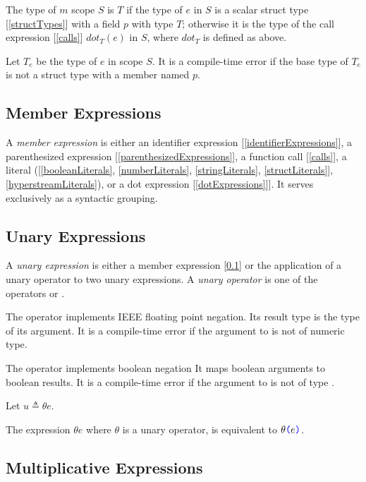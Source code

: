 \documentclass{article}
\begin{document}
The type of $m$ scope $S$
 is $T$ if the type of $e$ in $S$ is a scalar struct type [\ref{structTypes}] with a field $p$ with type $T$; otherwise it is the type of the call expression [\ref{calls}] $dot_T(e)$ in $S$, where $dot_T$ is defined as above.

Let $T_e$ be the type of $e$ in scope $S$.  It is a compile-time error if the base type of $T_e$ is not a struct type with a member named $p$. 

\subsection{Member Expressions}
\label{memberExpression}

A {\em member expression} is either an identifier expression [\ref{identifierExpressions}], a parenthesized expression [\ref{parenthesizedExpressions}], a function call [\ref{calls}], a literal ([\ref{booleanLiterals}, \ref{numberLiterals}, \ref{stringLiterals}, \ref{structLiterals}], \ref{hyperstreamLiterals}), or a dot expression [\ref{dotExpressions}]]. It serves exclusively as a syntactic grouping.


\subsection{Unary Expressions}
\label{unaryExpressions}

A {\em unary expression} is either a member expression [\ref{memberExpression}] or the application of a unary operator to two unary expressions.
A {\em unary operator} is one of the operators \MINUS{} or  \NOT{}. 

The \MINUS{} operator implements IEEE floating point negation. Its result type is the type of its argument. It is a compile-time error if the argument to \MINUS{} is not of numeric type. 

The \NOT{} operator implements boolean negation It maps boolean arguments to boolean results. It is a compile-time error if the argument to \NOT{} is not of type \BOOL.

\UnaryExpression{}

Let $u \triangleq \theta{} e$.

The expression $\theta e$ where $\theta$ is a unary operator, is equivalent to $\theta\texttt{\color{blue} (}{}e\texttt{\color{blue} )}{}$.

\subsection{Multiplicative Expressions}
\label{multiplicativeExpressions}
\end{document}
